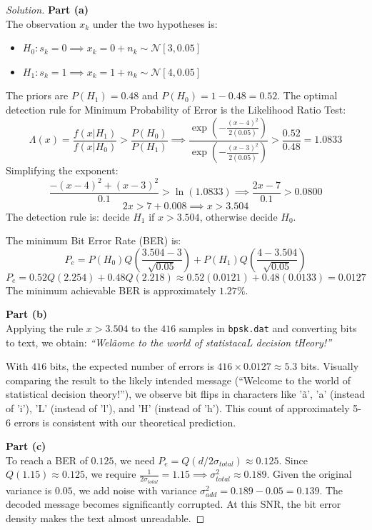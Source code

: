 \documentclass{article}
\begin{document}
\begin{proof}[Solution]
	\textbf{Part (a)}\\
	The observation $x_k$ under the two hypotheses is:
	\begin{itemize}
		\item $H_0: s_k = 0 \implies x_k = 0 + n_k \sim \mathcal{N}[3, 0.05]$
		\item $H_1: s_k = 1 \implies x_k = 1 + n_k \sim \mathcal{N}[4, 0.05]$
	\end{itemize}
	The priors are $P(H_1) = 0.48$ and $P(H_0) = 1 - 0.48 = 0.52$. The optimal detection rule for Minimum Probability of Error is the Likelihood Ratio Test:
	\[ \Lambda(x) = \frac{f(x|H_1)}{f(x|H_0)} > \frac{P(H_0)}{P(H_1)} \implies \frac{\exp\left(-\frac{(x-4)^2}{2(0.05)}\right)}{\exp\left(-\frac{(x-3)^2}{2(0.05)}\right)} > \frac{0.52}{0.48} = 1.0833 \]
	Simplifying the exponent:
	\[ \frac{-(x-4)^2 + (x-3)^2}{0.1} > \ln(1.0833) \implies \frac{2x - 7}{0.1} > 0.0800 \]
	\[ 2x > 7 + 0.008 \implies x > 3.504 \]
	The detection rule is: decide $H_1$ if $x > 3.504$, otherwise decide $H_0$.
	
	The minimum Bit Error Rate (BER) is:
	\[ P_e = P(H_0) Q\left(\frac{3.504 - 3}{\sqrt{0.05}}\right) + P(H_1) Q\left(\frac{4 - 3.504}{\sqrt{0.05}}\right) \]
	\[ P_e = 0.52 Q(2.254) + 0.48 Q(2.218) \approx 0.52(0.0121) + 0.48(0.0133) = 0.0127 \]
	The minimum achievable BER is approximately $1.27\%$.

	\textbf{Part (b)}\\
	Applying the rule $x > 3.504$ to the $416$ samples in \texttt{bpsk.dat} and converting bits to text, we obtain:
	\textit{``Welãome to the world of statistacaL decision tHeory!''}
	
	With $416$ bits, the expected number of errors is $416 \times 0.0127 \approx 5.3$ bits.
    Visually comparing the result to the likely intended message (``Welcome to the world of statistical decision theory!''),
    we observe bit flips in characters like 'ã', 'a' (instead of 'i'), 'L' (instead of 'l'), and 'H' (instead of 'h').
    This count of approximately 5-6 errors is consistent with our theoretical prediction.

	\textbf{Part (c)}\\
	To reach a BER of $0.125$, we need $P_e = Q(d/2\sigma_{total}) \approx 0.125$. Since $Q(1.15) \approx 0.125$, we require $\frac{1}{2\sigma_{total}} = 1.15 \implies \sigma_{total}^2 \approx 0.189$. Given the original variance is $0.05$, we add noise with variance $\sigma_{add}^2 = 0.189 - 0.05 = 0.139$.
	The decoded message becomes significantly corrupted. At this SNR, the bit error density makes the text almost unreadable.
\end{proof}
\end{document}
